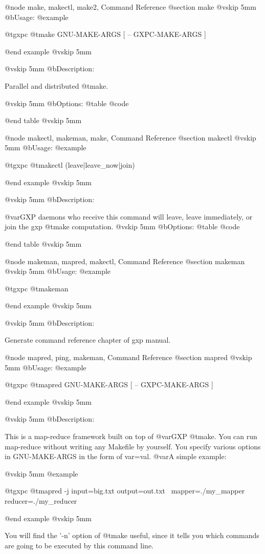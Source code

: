 @node make, makectl, make2, Command Reference
@section make
@vskip 5mm
@b{Usage:}
@example

  @t{gxpc} @t{make} GNU-MAKE-ARGS [ -- GXPC-MAKE-ARGS ]

@end example
@vskip 5mm

@vskip 5mm
@b{Description:}


  Parallel and distributed @t{make}.

@vskip 5mm
@b{Options:}
@table @code


@end table
@vskip 5mm

@node makectl, makeman, make, Command Reference
@section makectl
@vskip 5mm
@b{Usage:}
@example

  @t{gxpc} @t{makectl} (leave|leave_now|join)

@end example
@vskip 5mm

@vskip 5mm
@b{Description:}


  @var{GXP} daemons who receive this command will leave, leave immediately,
or join the gxp @t{make} computation.
@vskip 5mm
@b{Options:}
@table @code


@end table
@vskip 5mm

@node makeman, mapred, makectl, Command Reference
@section makeman
@vskip 5mm
@b{Usage:}
@example

  @t{gxpc} @t{makeman}

@end example
@vskip 5mm

@vskip 5mm
@b{Description:}


  Generate command reference chapter of gxp manual.

@node mapred, ping, makeman, Command Reference
@section mapred
@vskip 5mm
@b{Usage:}
@example

  @t{gxpc} @t{mapred} GNU-MAKE-ARGS [ -- GXPC-MAKE-ARGS ]

@end example
@vskip 5mm

@vskip 5mm
@b{Description:}


  This is a map-reduce framework built on top of @var{GXP} @t{make}.
You can run map-reduce without writing any Makefile by yourself.
You specify various options in GNU-MAKE-ARGS in the form of 
var=val.  @var{A} simple example:

@vskip 5mm
@example

  @t{gxpc} @t{mapred} -j input=big.txt output=out.txt \
    mapper=./my_mapper reducer=./my_reducer

@end example
@vskip 5mm

You will find the '-n' option of @t{make} useful, since it tells you
which commands are going to be executed by this command line.

